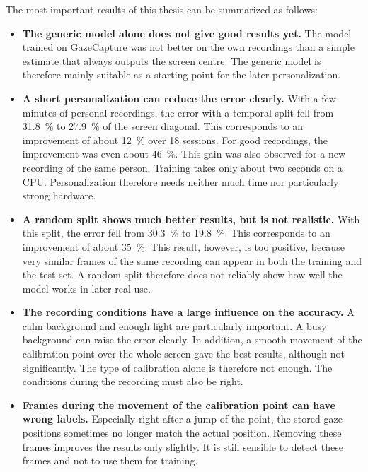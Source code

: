 The most important results of this thesis can be summarized as follows:
\begin{itemize}
  \item \textbf{The generic model alone does not give good results yet.} The
        model trained on GazeCapture was not better on the own recordings than
        a simple estimate that always outputs the screen centre. The generic
        model is therefore mainly suitable as a starting point for the later
        personalization.
  \item \textbf{A short personalization can reduce the error clearly.} With a
        few minutes of personal recordings, the error with a temporal split fell
        from \SI{31.8}{\percent} to \SI{27.9}{\percent} of the screen diagonal.
        This corresponds to an improvement of about \SI{12}{\percent} over 18
        sessions. For good recordings, the improvement was even about
        \SI{46}{\percent}. This gain was also observed for a new recording of
        the same person. Training takes only about two seconds on a CPU.
        Personalization therefore needs neither much time nor particularly
        strong hardware.
  \item \textbf{A random split shows much better results, but is not
        realistic.} With this split, the error fell from \SI{30.3}{\percent} to
        \SI{19.8}{\percent}. This corresponds to an improvement of about
        \SI{35}{\percent}. This result, however, is too positive, because very
        similar frames of the same recording can appear in both the training
        and the test set. A random split therefore does not reliably show how
        well the model works in later real use.
  \item \textbf{The recording conditions have a large influence on the
        accuracy.} A calm background and enough light are particularly
        important. A busy background can raise the error clearly. In addition, a
        smooth movement of the calibration point over the whole screen gave the
        best results, although not significantly. The type of calibration alone
        is therefore not enough. The conditions during the recording must also
        be right.
  \item \textbf{Frames during the movement of the calibration point can have
        wrong labels.} Especially right after a jump of the point, the stored
        gaze positions sometimes no longer match the actual position. Removing
        these frames improves the results only slightly. It is still sensible
        to detect these frames and not to use them for training.

\end{itemize}
